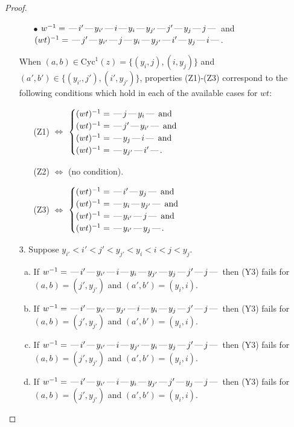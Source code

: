 \documentclass[10pt]{article}
\theoremstyle{definition}
\theoremstyle{definition}
\def\dash{\text{\hspace{0.5mm}---\hspace{0.5mm}}}
\def\Cyc{\mathrm{Cyc}}
\begin{document}
\begin{proof}
\begin{enumerate}
\begin{enumerate}
\item[$\bullet$] $w^{-1} = \dash i'\dash y_{i'}\dash i\dash y_i\dash y_{j'}\dash j'\dash y_j\dash j\dash $ and $(wt)^{-1} = \dash j'\dash y_{i'}\dash j\dash y_i\dash y_{j'}\dash i'\dash y_j\dash i\dash $.
\end{enumerate}
When $(a,b)\in\Cyc^1(z)=\{(y_i,j),(i,y_j)\}$ and $(a',b')\in\{(y_{i'},j'),(i',y_{j'})\}$,
properties (Z1)-(Z3) correspond to the following conditions which
hold in each of the available cases for $wt$:
\begin{enumerate}
\item[](Z1) $\Leftrightarrow$ $\begin{cases}\text{$(wt)^{-1} = \dash j \dash y_i \dash$}\text{ and }\\
\text{$(wt)^{-1} = \dash j' \dash y_{i'} \dash$}\text{ and }\\
\text{$(wt)^{-1} = \dash y_j \dash i \dash$}\text{ and }\\
\text{$(wt)^{-1} = \dash y_{j'} \dash i' \dash$}.\end{cases}$
\item[](Z2) $\Leftrightarrow$ (no condition).
\item[](Z3) $\Leftrightarrow$ $\begin{cases}\text{$(wt)^{-1} = \dash i' \dash y_j \dash$}\text{ and }\\
\text{$(wt)^{-1} = \dash y_i \dash y_{j'} \dash$}\text{ and }\\
\text{$(wt)^{-1} = \dash y_{i'} \dash j \dash$}\text{ and }\\
\text{$(wt)^{-1} = \dash y_{i'} \dash y_j \dash$}.\end{cases}$
\end{enumerate}
\item[$3$.] Suppose $y_{i'} < i' < j' < y_{j'} < y_i < i < j < y_j$.
\begin{enumerate}[(a)]
\item If $w^{-1} = \dash i'\dash y_{i'}\dash i\dash y_i\dash y_{j'}\dash y_j\dash j'\dash j\dash $ then (Y3) fails for $(a,b)=(j',y_{j'})$ and $(a',b')=(y_i,i)$.
\item If $w^{-1} = \dash i'\dash y_{i'}\dash y_{j'}\dash i\dash y_i\dash y_j\dash j'\dash j\dash $ then (Y3) fails for $(a,b)=(j',y_{j'})$ and $(a',b')=(y_i,i)$.
\item If $w^{-1} = \dash i'\dash y_{i'}\dash i\dash y_{j'}\dash y_i\dash y_j\dash j'\dash j\dash $ then (Y3) fails for $(a,b)=(j',y_{j'})$ and $(a',b')=(y_i,i)$.
\item If $w^{-1} = \dash i'\dash y_{i'}\dash i\dash y_i\dash y_{j'}\dash j'\dash y_j\dash j\dash $ then (Y3) fails for $(a,b)=(j',y_{j'})$ and $(a',b')=(y_i,i)$.

\end{enumerate}
\end{enumerate}
\end{proof}
\end{document}

